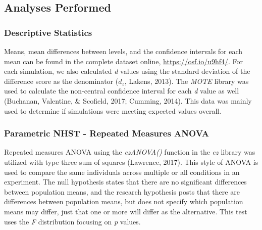 \documentclass[english,man]{apa6}
\theoremstyle{definition}
\theoremstyle{definition}
\theoremstyle{definition}
\theoremstyle{remark}
\begin{document}
\subsection{Analyses Performed}\label{analyses-performed}

\subsubsection{Descriptive Statistics}\label{descriptive-statistics}

Means, mean differences between levels, and the confidence intervals for
each mean can be found in the complete dataset online,
\url{https://osf.io/u9hf4/}. For each simulation, we also calculated
\emph{d} values using the standard deviation of the difference score as
the denominator (\(d_{z}\), Lakens, 2013). The \emph{MOTE} library was
used to calculate the non-central confidence interval for each \emph{d}
value as well (Buchanan, Valentine, \& Scofield, 2017; Cumming, 2014).
This data was mainly used to determine if simulations were meeting
expected values overall.

\subsubsection{Parametric NHST - Repeated Measures
ANOVA}\label{parametric-nhst---repeated-measures-anova}

Repeated measures ANOVA using the \emph{ezANOVA()} function in the
\emph{ez} library was utilized with type three sum of squares (Lawrence,
2017). This style of ANOVA is used to compare the same individuals
across multiple or all conditions in an experiment. The null hypothesis
states that there are no significant differences between population
means, and the research hypothesis posts that there are differences
between population means, but does not specify which population means
may differ, just that one or more will differ as the alternative. This
test uses the \emph{F} distribution focusing on \emph{p} values.
\end{document}
